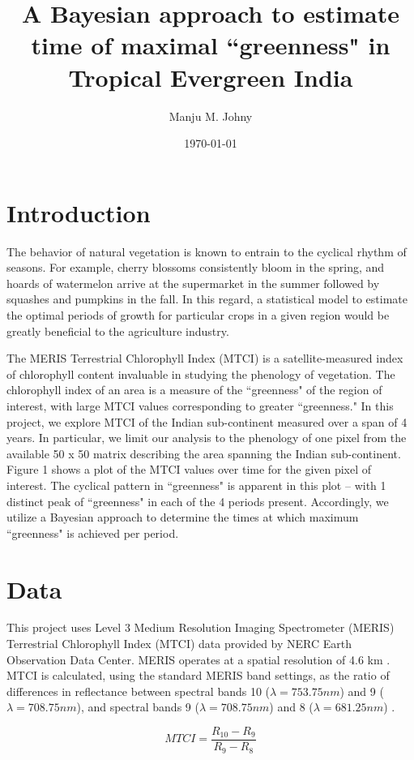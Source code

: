\documentclass[12pt, a4paper]{article}
\title{A Bayesian approach to estimate time of maximal ``greenness" in Tropical Evergreen India}
\author{Manju M. Johny}
\date{\small \today}
\begin{document}
\maketitle


\section{Introduction }
\qquad The behavior of natural vegetation is known to entrain to the cyclical rhythm of seasons. For example, cherry blossoms consistently bloom in the spring, and hoards of watermelon arrive at the supermarket in the summer followed  
by squashes and pumpkins in the fall. In this regard, a statistical model to estimate the optimal periods of growth for particular crops in a given region would be greatly beneficial to the agriculture industry. 

The MERIS Terrestrial Chlorophyll Index (MTCI) is a satellite-measured index of chlorophyll content invaluable in studying the phenology of vegetation. The chlorophyll index of an area is a measure of the ``greenness" of the region of interest, with large MTCI values corresponding to greater ``greenness." In this project, we explore MTCI of the Indian sub-continent measured over a span of 4 years. In particular, we limit our analysis to the phenology of one pixel from the available 50 x 50 matrix describing the area spanning the Indian sub-continent. Figure 1 shows a plot of the MTCI values over time for the given pixel of interest. The cyclical pattern in ``greenness" is apparent in this plot -- with 1 distinct peak of ``greenness" in each of the 4 periods present. Accordingly, we utilize a Bayesian approach to determine the times at which maximum ``greenness" is achieved per period.    

\section{Data}
\qquad This project uses Level 3 Medium Resolution Imaging Spectrometer (MERIS) Terrestrial Chlorophyll Index (MTCI) data provided by NERC Earth Observation Data Center. MERIS operates at a spatial resolution of 4.6 km \cite{dash}. MTCI is calculated, using the standard MERIS band settings, as the ratio of differences in reflectance between spectral bands 10 ($\lambda = 753.75 nm$) and 9 ($\lambda = 708.75 nm$), and spectral bands 9 ($\lambda =  708.75 nm$) and 8 ($\lambda =  681.25 nm$) \cite{Jeg}. 

\begin{equation}
MTCI = \frac{R_{10} - R_{9}}{R_{9} - R_{8}}
\end{equation}
\end{document}
